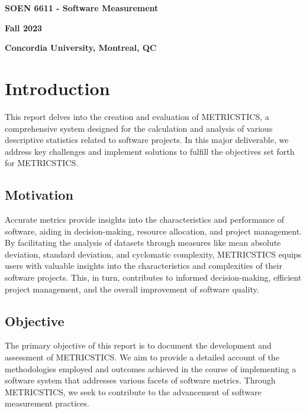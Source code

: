 \documentclass[runningheads]{llncs}
\begin{document}
\begin{titlepage}
\begin{center}
\begin{large}
\begin{Large}
\textbf{SOEN 6611 - Software Measurement} \\
\begin{Large}
\vspace*{0.05in}
\textbf{Fall 2023} \\
\end{Large}
\vspace*{0.3in}
\textbf{Concordia University, Montreal, QC}
\end{Large}

\end{large}
\end{center}
\end{titlepage}


\newcommand{\CC}{C\nolinebreak\hspace{-.05em}\raisebox{.4ex}{\tiny\bf +}\nolinebreak\hspace{-.10em}\raisebox{.4ex}{\tiny\bf +}}
\def\CC{{C\nolinebreak[4]\hspace{-.05em}\raisebox{.4ex}{\tiny\bf ++}}}

\setcounter{tocdepth}{2} \tableofcontents
\newpage
\section{Introduction}
This report delves into the creation and evaluation of METRICSTICS,  a comprehensive system designed for the calculation and analysis of various descriptive statistics related to software projects. In this major deliverable, we address key challenges and implement solutions to fulfill the objectives set forth for METRICSTICS.
\subsection{Motivation}
Accurate metrics provide insights into the characteristics and performance of software, aiding in decision-making, resource allocation, and project management. By facilitating the analysis of datasets through measures like mean absolute deviation, standard deviation, and cyclomatic complexity, METRICSTICS equips users with valuable insights into the characteristics and complexities of their software projects. This, in turn, contributes to informed decision-making, efficient project management, and the overall improvement of software quality.
\subsection{Objective}
The primary objective of this report is to document the development and assessment of METRICSTICS. We aim to provide a detailed account of the methodologies employed and outcomes achieved in the course of implementing a software system that addresses various facets of software metrics. Through METRICSTICS, we seek to contribute to the advancement of software measurement practices.
\end{document}
